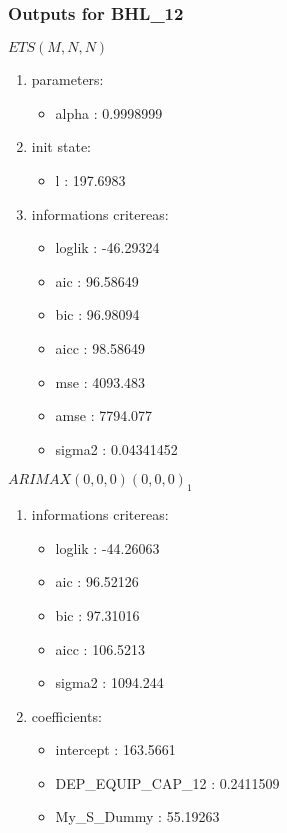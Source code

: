 \documentclass[10pt,a4paper]{article}\usepackage[]{graphicx}\usepackage[]{color}
\newcommand{\AaA}{\_}
\begin{document}
\subsubsection{Outputs for BHL\AaA 12}
\begin{multicols}{2}


$ ETS(M,N,N) $
\begin{enumerate}
\item parameters:
\begin{itemize}
\item  alpha :  0.9998999 
\end{itemize}
\item init state:
\begin{itemize}
\item  l :  197.6983 
\end{itemize}
\item informations critereas:
\begin{itemize}
\item  loglik :  -46.29324 
\item  aic :  96.58649 
\item  bic :  96.98094 
\item  aicc :  98.58649 
\item  mse :  4093.483 
\item  amse :  7794.077 
\item  sigma2 :  0.04341452 
\end{itemize}
\end{enumerate}

\columnbreak


 $ARIMAX(0,0,0)(0,0,0)_{1}$ 
\begin{enumerate}
\item informations critereas:
\begin{itemize}
\item  loglik :  -44.26063 
\item  aic :  96.52126 
\item  bic :  97.31016 
\item  aicc :  106.5213 
\item  sigma2 :  1094.244 
\end{itemize}

\item coefficients:
\begin{itemize}
\item  intercept :  163.5661 
\item  DEP\AaA EQUIP\AaA CAP\AaA 12 :  0.2411509 
\item  My_S_Dummy :  55.19263 
\end{itemize}
\end{enumerate}
\end{multicols}
\end{document}
